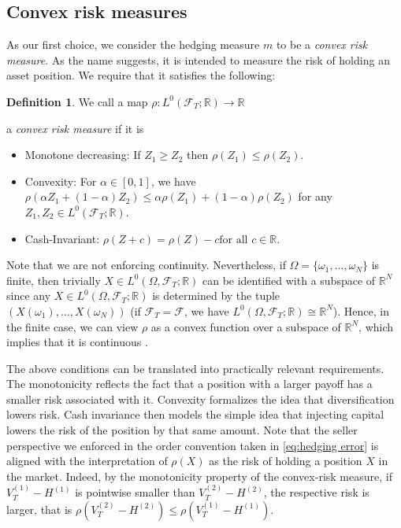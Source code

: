 \documentclass[11pt,a4paper,twoside,openany]{report}
\numberwithin{equation}{section}
\theoremstyle{plain} %
\theoremstyle{definition} %
\newtheorem{definition}[theorem]{Definition}
\theoremstyle{remark} %
\let\parencite\authnumparencite
\begin{document}
\subsection{Convex risk measures}
As our first choice, we consider the hedging measure \(m\) to be a \textit{convex risk measure}. As the name suggests, it is intended to measure the risk of holding an asset position. We require that it satisfies the following:
\begin{definition}\label{def:convex risk measure buehler convention}
    We call a map \(\rho: L^0(\mathcal{F}_T;\mathbb{R})\to\mathbb{R}\)
\end{definition} a \textit{convex risk measure} if it is
\begin{itemize}
    \item Monotone decreasing: If \(Z_1\geq Z_2\) then \(\rho(Z_1)\leq\rho(Z_2)\).
    \item Convexity: For \(\alpha\in[0,1]\), we have \(\rho(\alpha Z_1+(1-\alpha)Z_2)\leq \alpha\rho(Z_1)+(1-\alpha)\rho(Z_2)\) for any \(Z_1,Z_2\in L^0(\mathcal{F}_T;\mathbb{R})\). 
    \item Cash-Invariant: \(\rho(Z+c)=\rho(Z)-c  \text{for all } c\in\mathbb{R}\).
\end{itemize}
Note that we are not enforcing continuity. Nevertheless, if \(\Omega=\{\omega_1,\dots,\omega_N\}\) is finite, then trivially \(X\in L^0(\Omega,\mathcal{F}_T;\mathbb{R})\) can be identified with a subspace of \( \mathbb{R}^N\) since any \(X\in L^0(\Omega,\mathcal{F}_T;\mathbb{R})\) is determined by the tuple \((X(\omega_1),\dots,X(\omega_N))\) (if \(\mathcal{F}_T=\mathcal{F}\), we have \( L^0(\Omega,\mathcal{F}_T;\mathbb{R})\cong \mathbb{R}^N\)). Hence, in the finite case, we can view \(\rho\) as a convex function over a subspace of \(\mathbb{R}^N\), which implies that it is continuous \parencite[Thm.~10.1]{Rockafellar1970ConvexAnalysis}.


The above conditions can be translated into practically relevant requirements. The monotonicity reflects the fact that a position with a larger payoff has a smaller risk associated with it. Convexity formalizes the idea that diversification lowers risk. Cash invariance then models the simple idea that injecting capital lowers the risk of the position by that same amount. Note that the seller perspective we enforced in the order convention taken in \eqref{eq:hedging error} is aligned with the interpretation of \(\rho(X)\) as the risk of holding a position \(X\) in the market. Indeed, by the monotonicity property of the convex-risk measure, if \(V_T^{(1)}-H^{(1)}\) is pointwise smaller than \(V_T^{(2)}-H^{(2)}\), the respective risk is larger, that is \(\rho(V_T^{(2)}-H^{(2)})\leq\rho(V_T^{(1)}-H^{(1)})\).
\end{document}

